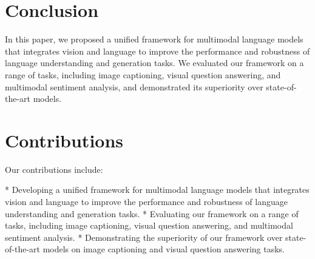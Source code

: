 \documentclass{article}
\begin{document}
\section{Conclusion}

In this paper, we proposed a unified framework for multimodal language models that integrates vision and language to improve the performance and robustness of language understanding and generation tasks. We evaluated our framework on a range of tasks, including image captioning, visual question answering, and multimodal sentiment analysis, and demonstrated its superiority over state-of-the-art models.

\section{Contributions}

Our contributions include:

* Developing a unified framework for multimodal language models that integrates vision and language to improve the performance and robustness of language understanding and generation tasks.
* Evaluating our framework on a range of tasks, including image captioning, visual question answering, and multimodal sentiment analysis.
* Demonstrating the superiority of our framework over state-of-the-art models on image captioning and visual question answering tasks.
\end{document}
